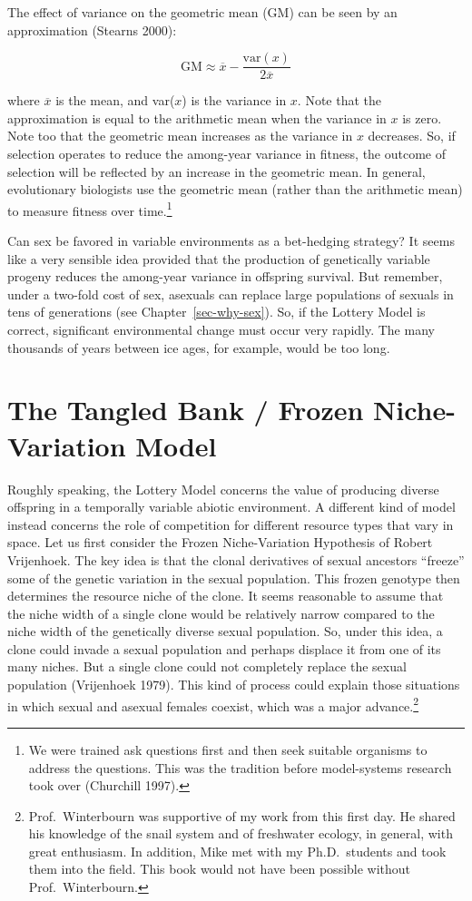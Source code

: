 \documentclass[
  letterpaper,
]{book}
\begin{document}
The effect of variance on the geometric mean (GM) can be seen by an
approximation (Stearns 2000):

\[\text{GM} \approx \overline{x} - \frac{\text{var}(x)}{2\overline{x}}\]

where \(\overline{x}\) is the mean, and var(\(x\)) is the variance in
\(x\). Note that the approximation is equal to the arithmetic mean when
the variance in \(x\) is zero. Note too that the geometric mean
increases as the variance in \(x\) decreases. So, if selection operates
to reduce the among-year variance in fitness, the outcome of selection
will be reflected by an increase in the geometric mean. In general,
evolutionary biologists use the geometric mean (rather than the
arithmetic mean) to measure fitness over time.\footnote{We were trained
  ask questions first and then seek suitable organisms to address the
  questions. This was the tradition before model-systems research took
  over (Churchill 1997).}

Can sex be favored in variable environments as a bet-hedging strategy?
It seems like a very sensible idea provided that the production of
genetically variable progeny reduces the among-year variance in
offspring survival. But remember, under a two-fold cost of sex, asexuals
can replace large populations of sexuals in tens of generations (see
Chapter~\ref{sec-why-sex}). So, if the Lottery Model is correct,
significant environmental change must occur very rapidly. The many
thousands of years between ice ages, for example, would be too long.

\section{The Tangled Bank / Frozen Niche-Variation
Model}\label{sec-niche}

Roughly speaking, the Lottery Model concerns the value of producing
diverse offspring in a temporally variable abiotic environment. A
different kind of model instead concerns the role of competition for
different resource types that vary in space. Let us first consider the
Frozen Niche-Variation Hypothesis of Robert Vrijenhoek. The key idea is
that the clonal derivatives of sexual ancestors ``freeze'' some of the
genetic variation in the sexual population. This frozen genotype then
determines the resource niche of the clone. It seems reasonable to
assume that the niche width of a single clone would be relatively narrow
compared to the niche width of the genetically diverse sexual
population. So, under this idea, a clone could invade a sexual
population and perhaps displace it from one of its many niches. But a
single clone could not completely replace the sexual population
(Vrijenhoek 1979). This kind of process could explain those situations
in which sexual and asexual females coexist, which was a major
advance.\footnote{Prof.~Winterbourn was supportive of my work from this
  first day. He shared his knowledge of the snail system and of
  freshwater ecology, in general, with great enthusiasm. In addition,
  Mike met with my Ph.D.~students and took them into the field. This
  book would not have been possible without Prof.~Winterbourn.}
\end{document}
